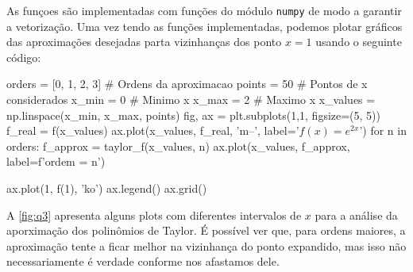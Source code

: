 \documentclass[10pt, a4paper]{article}
\begin{document}
As funçoes são implementadas com funções do módulo 
{\tt numpy} de modo a garantir a vetorização. Uma vez tendo as funções implementadas,
podemos plotar gráficos das aproximações desejadas parta vizinhanças dos ponto $x = 1$
usando o seguinte código:

\begin{python}
orders = [0, 1, 2, 3] # Ordens da aproximacao
points = 50 # Pontos de x considerados
x_min = 0 # Minimo x
x_max = 2 # Maximo x
x_values = np.linspace(x_min, x_max, points)
fig, ax = plt.subplots(1,1, figsize=(5, 5))
f_real = f(x_values)
ax.plot(x_values, f_real, 'm--', label='$f(x) = e^{2x}$')
for n in orders:
    f_approx = taylor_f(x_values, n)
    ax.plot(x_values, f_approx, label=f'ordem = {n}')

ax.plot(1, f(1), 'ko')
ax.legend()
ax.grid()
\end{python}

A \cref{fig:q3} apresenta alguns plots com diferentes intervalos de $x$ para a análise
da aporximação dos polinômios de Taylor. É possível ver que, para ordens maiores, a aproximação
tente a ficar melhor na vizinhança do ponto expandido, mas isso não necessariamente é verdade 
conforme nos afastamos dele.
\end{document}
